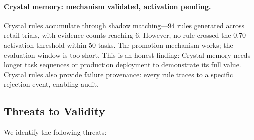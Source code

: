 \documentclass[11pt]{article}
\begin{document}
\paragraph{Crystal memory: mechanism validated, activation pending.}
Crystal rules accumulate through shadow matching---94 rules generated
across retail trials, with evidence counts reaching 6.
However, no rule crossed the 0.70 activation threshold within 50 tasks.
The promotion mechanism works; the evaluation window is too short.
This is an honest finding: Crystal memory needs longer task sequences
or production deployment to demonstrate its full value.
Crystal rules also provide failure provenance: every rule
traces to a specific rejection event, enabling audit.

\subsection{Threats to Validity}
\label{sec:threats}

We identify the following threats:
\end{document}
